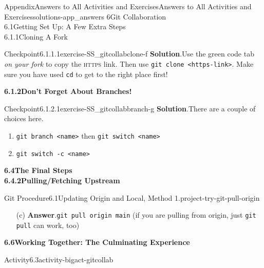 \documentclass[oneside,10pt,]{book}
\newcommand{\blocktitlefont}{\relax}
\newcommand{\mono}[1]{\texttt{#1}}
\newcommand{\initialism}[1]{\textsc{\MakeLowercase{#1}}}
\begin{document}
\begin{solutions-chapter}{Appendix}{Answers to All Activities and Exercises}{}{Answers to All Activities and Exercises}{}{}{solutions-app_answers}
{6\space\textperiodcentered\space{}Git Collaboration\\
6.1\space\textperiodcentered\space{}Getting Set Up: A Few Extra Steps\\
6.1.1\space\textperiodcentered\space{}Cloning A Fork}
\begin{inlinesolution}{Checkpoint}{6.1.1.1}{}{exercise-SS_gitcollabclone-f}%
\noindent\textbf{\blocktitlefont Solution}.\hypertarget{solution-SS_gitcollabclone-f-b-back}{}\quad{}Use the green code tab \emph{on your fork} to copy the \initialism{HTTPS} link. Then use \mono{git clone <https-link>}. Make sure you have used \mono{cd} to get to the right place first!%
\end{inlinesolution}%
\par\medskip
\noindent\textbf{\Large{}6.1.2\space\textperiodcentered\space{}Don't Forget About Branches!}
\begin{inlinesolution}{Checkpoint}{6.1.2.1}{}{exercise-SS_gitcollabbranch-g}%
\noindent\textbf{\blocktitlefont Solution}.\hypertarget{solution-SS_gitcollabbranch-g-b-back}{}\quad{}There are a couple of choices here.%
\begin{enumerate}
\item{}\mono{git branch <name>} then \mono{git switch <name>}%
\item{}\mono{git switch -c <name>}%
\end{enumerate}
%
\end{inlinesolution}%
\par\medskip
\noindent\textbf{\Large{}6.4\space\textperiodcentered\space{}The Final Steps\\
6.4.2\space\textperiodcentered\space{}Pulling\slash{}Fetching Upstream}
\begin{projectsolution}{Git Procedure}{6.1}{Updating Origin and Local, Method 1.}{project-try-git-pull-origin}%
\begin{enumerate}[font=\bfseries,label=(\alph*),ref=\alph*]%
\item[(c)]\noindent\textbf{\blocktitlefont Answer}.\hypertarget{answer-try-git-pull-origin-i-b-back}{}\quad{}\mono{git pull origin main} (if you are pulling from origin, just \mono{git pull} can work, too)%
\end{enumerate}%
\end{projectsolution}%
\par\medskip
\noindent\textbf{\Large{}6.6\space\textperiodcentered\space{}Working Together: The Culminating Experience}
\begin{activitysolution}{Activity}{6.3}{}{activity-bigact-gitcollab}%

\end{activitysolution}
\end{solutions-chapter}
\end{document}
